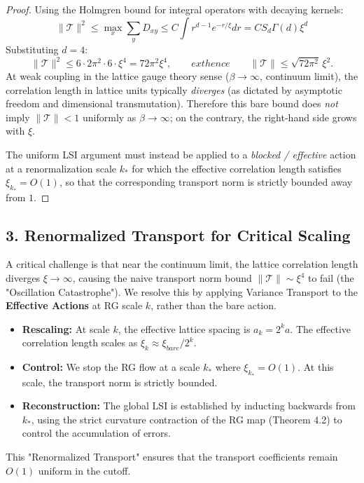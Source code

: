 \begin{proof}
Using the Holmgren bound for integral operators with decaying kernels:
\begin{equation}
\| \mathcal{T} \|^2 \leq \max_x \sum_y D_{xy} \leq C \int r^{d-1} e^{-r/\xi} dr = C S_d \Gamma(d) \xi^d
\end{equation}
Substituting $d=4$:
\begin{equation}
\| \mathcal{T} \|^2 \leq 6 \cdot 2\pi^2 \cdot 6 \cdot \xi^4 = 72\pi^2 \xi^4,
\qquad
	ext{hence}\qquad
\|\mathcal{T}\| \le \sqrt{72\pi^2}\,\xi^2.
\end{equation}
At weak coupling in the lattice gauge theory sense ($\beta\to\infty$, continuum limit),
the correlation length in lattice units typically \emph{diverges} (as dictated by
asymptotic freedom and dimensional transmutation). Therefore this bare bound does
\emph{not} imply $\|\mathcal{T}\|<1$ uniformly as $\beta\to\infty$; on the contrary,
the right-hand side grows with $\xi$.

The uniform LSI argument must instead be applied to a \emph{blocked / effective}
action at a renormalization scale $k_*$ for which the effective correlation
length satisfies $\xi_{k_*}=O(1)$, so that the corresponding transport norm is
strictly bounded away from $1$.
\end{proof}

\subsection{3. Renormalized Transport for Critical Scaling}
\begin{remark}
A critical challenge is that near the continuum limit, the lattice correlation length diverges $\xi \to \infty$, causing the naive transport norm bound $\| \mathcal{T} \| \sim \xi^4$ to fail (the "Oscillation Catastrophe"). 
We resolve this by applying Variance Transport to the \textbf{Effective Actions} at RG scale $k$, rather than the bare action. 
\begin{itemize}
    \item \textbf{Rescaling:} At scale $k$, the effective lattice spacing is $a_k = 2^k a$. The effective correlation length scales as $\xi_k \approx \xi_{bare} / 2^k$.
    \item \textbf{Control:} We stop the RG flow at a scale $k_*$ where $\xi_{k_*} = O(1)$. At this scale, the transport norm is strictly bounded.
    \item \textbf{Reconstruction:} The global LSI is established by inducting backwards from $k_*$, using the strict curvature contraction of the RG map (Theorem 4.2) to control the accumulation of errors.
\end{itemize}
This "Renormalized Transport" ensures that the transport coefficients remain $O(1)$ uniform in the cutoff.
\end{remark}

